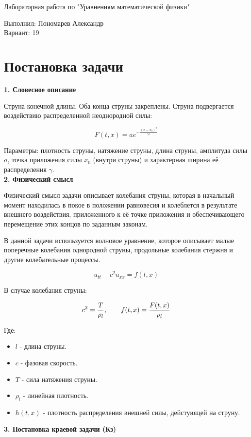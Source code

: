 \documentclass[a4paper]{article}
\begin{document}
\begin{center}
    \Large Лабораторная работа по "Уравнениям математической физики" \\
\end{center}

\begin{center}
Выполнил: Пономарев Александр \\
Вариант: 19 \\

\end{center}

\section{Постановка задачи}

\textbf{1. Словесное описание}

Струна конечной длины. Оба конца струны закреплены. Струна подвергается
воздействию распределенной неоднородной силы:

$$
    F(t, x) = ae^{-\frac{(x-x_0)^2}{\gamma^2}}
$$

Параметры:
    плотность струны,
    натяжение струны,
    длина струны,
    амплитуда силы $ a $,
    точка приложения силы $ x_0 $ (внутри струны)
    и характерная ширина её распределения $ \gamma $. \\
\textbf{2. Физический смысл}

Физический смысл задачи описывает колебания струны, которая в начальный момент находилась в покое в положении равновесия и колеблется в результате внешнего воздействия, приложенного к её точке приложения и обеспечивающего перемещение этих концов по заданным законам.

В данной задачи используется волновое уравнение, которое описывает малые поперечные колебания однородной струны, продольные колебания стержня и другие колебательные процессы.

$$u_{tt}-c^2u_{xx}=f(t,x)$$

В случае колебания струны:

$$c^2={T\over \rho_l}, \qquad f(t,x)={F(t,x)\over \rho_l}$$

Где:
\begin{itemize}
    \item $ l $ - длина струны.
    \item $ c $ - фазовая скорость.
    \item $ T $ - сила натяжения струны.
    \item $ \rho_l $ - линейная плотность.
    \item $ h(t,x) $ - плотность распределения внешней силы, дейстующей на струну.
\end{itemize}
\textbf{3. Постановка краевой задачи (Кз)}
\end{document}
